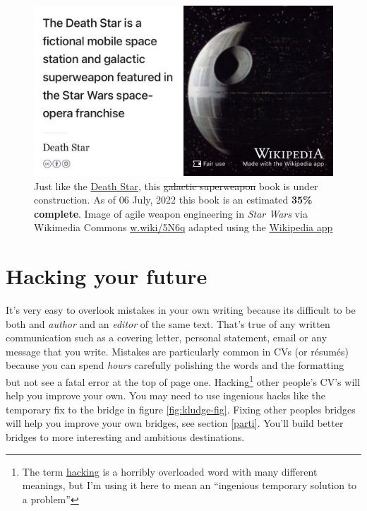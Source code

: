 \documentclass[
]{book}
\begin{document}
\begin{figure}

{\centering \includegraphics[width=0.99\linewidth]{images/DeathStar2} 

}

\caption{Just like the \href{https://en.wikipedia.org/wiki/Death_Star}{Death Star}, this \sout{galactic superweapon} book is under construction. As of 06 July, 2022 this book is an estimated \textbf{35\% complete}. Image of agile weapon engineering in \emph{Star Wars} via Wikimedia Commons \href{https://w.wiki/5N6q}{w.wiki/5N6q} adapted using the \href{https://apps.apple.com/gb/app/wikipedia/id324715238}{Wikipedia app}}\label{fig:deathstar19-fig}
\end{figure}

\hypertarget{hacking}{%
\chapter{Hacking your future}\label{hacking}}

It's very easy to overlook mistakes in your own writing because its difficult to be both and \emph{author} and an \emph{editor} of the same text. That's true of any written communication such as a covering letter, personal statement, email or any message that you write. Mistakes are particularly common in CVs (or résumés) because you can spend \emph{hours} carefully polishing the words and the formatting but not see a fatal error at the top of page one. Hacking\footnote{The term \href{https://en.wikipedia.org/wiki/Hacker_(disambiguation)}{hacking} is a horribly overloaded word with many different meanings, but I'm using it here to mean an ``ingenious temporary solution to a problem''} other people's CV's will help you improve your own. You may need to use ingenious hacks like the temporary fix to the bridge in figure \ref{fig:kludge-fig}. Fixing other peoples bridges will help you improve your own bridges, see section \ref{parti}. You'll build better bridges to more interesting and ambitious destinations.
\end{document}
